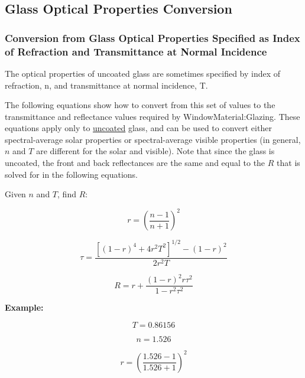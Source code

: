 \subsection{Glass Optical Properties Conversion}\label{glass-optical-properties-conversion}

\subsubsection{Conversion from Glass Optical Properties Specified as Index of Refraction and Transmittance at Normal Incidence}\label{conversion-from-glass-optical-properties-specified-as-index-of-refraction-and-transmittance-at-normal-incidence}

The optical properties of uncoated glass are sometimes specified by index of refraction, n, and transmittance at normal incidence, T.

The following equations show how to convert from this set of values to the transmittance and reflectance values required by WindowMaterial:Glazing. These equations apply only to \underline{uncoated} glass, and can be used to convert either spectral-average solar properties or spectral-average visible properties (in general, \(n\) and \(T\) are different for the solar and visible). Note that since the glass is uncoated, the front and back reflectances are the same and equal to the \(R\) that is solved for in the following equations.

Given \(n\) and \(T\), find \(R\):

\begin{equation*}
r = \left( \frac{n - 1}{n + 1} \right)^2
\end{equation*}

\begin{equation*}
\tau = \frac{ \left[ (1 - r)^4 + 4 r^2 T^2 \right]^{1/2} - (1 - r)^2}{2 r^2 T}
\end{equation*}

\begin{equation*}
R = r + \frac{(1 - r)^2 r \tau ^2}{1 - r^2 \tau ^2}
\end{equation*}

\textbf{Example:}

\begin{equation*}
T = 0.86156
\end{equation*}

\begin{equation*}
n = 1.526
\end{equation*}

\begin{equation*}
r = \left( \frac{1.526 - 1}{1.526 + 1} \right)^2
\end{equation*}

